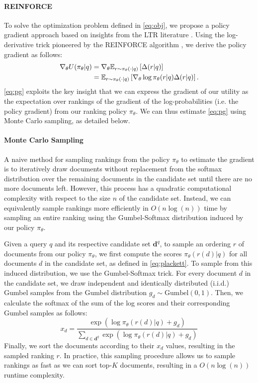 \documentclass{article}
\begin{document}
\paragraph{REINFORCE} To solve the optimization problem defined in \autoref{eq:obj}, we propose a policy gradient approach based on insights from the LTR literature \citep{singh2019policy, oosterhuis2021computationally}.  Using the log-derivative trick pioneered by the REINFORCE algorithm \citep{williams1992simple}, we derive the policy gradient as follows:
\begin{align}
    \nabla_\theta U(\pi_\theta | q) &= \nabla_\theta \mathbb{E}_{r\sim\pi_\theta(\cdot|q)}\left[\Delta(r|q)\right] \nonumber\\
    &= \mathbb{E}_{r \sim \pi_\theta(\cdot | q)} \left[ \nabla_\theta \log \pi_\theta(r | q) \Delta (r|q) \right].
    \label{eq:pg}
\end{align}
\autoref{eq:pg} exploits the key insight that we can express the gradient of our utility as the expectation over rankings of the gradient of the log-probabilities (i.e. the policy gradient) from our ranking policy $\pi_\theta$. We can thus estimate \autoref{eq:pg} using Monte Carlo sampling, as detailed below.


\paragraph{Monte Carlo Sampling} A naive method for sampling rankings from the policy $\pi_\theta$ to estimate the gradient is to iteratively draw documents without replacement from the softmax distribution over the remaining documents in the candidate set until there are no more documents left. However, this process has a quadratic computational complexity with respect to the size $n$ of the candidate set. Instead, we can equivalently sample rankings more efficiently in $O(n \log(n))$ time by sampling an entire ranking using the Gumbel-Softmax distribution \citep{jang2016categorical} induced by our policy $\pi_\theta$.


Given a query $q$ and its respective candidate set $\mathbf{d}^q$, to sample an ordering $r$ of documents from our policy $\pi_\theta$, we first compute the scores $\pi_\theta(r(d) | q)$ for all documents $d$ in the candidate set, as defined in \autoref{eq:plackett}.
To sample from this induced distribution, we use the Gumbel-Softmax trick. For every document $d$ in the candidate set, we draw independent and identically distributed (i.i.d.) Gumbel samples from the Gumbel distribution $g_d\sim\text{Gumbel}(0, 1)$. Then, we calculate the softmax of the sum of the log scores and their corresponding Gumbel samples as follows:
\begin{equation*}
    x_d = \frac{\exp(\log \pi_\theta(r(d) | q) + g_d)}{\sum_{d\in{\mathbf{d}^q}}\exp(\log \pi_\theta(r(d) | q) + g_d)}
\end{equation*}
Finally, we sort the documents according to their $x_d$ values, resulting in the sampled ranking $r$. In practice, this sampling procedure allows us to sample rankings as fast as we can sort top-$K$ documents, resulting in a $O(n\log(n))$ runtime complexity.
\end{document}
